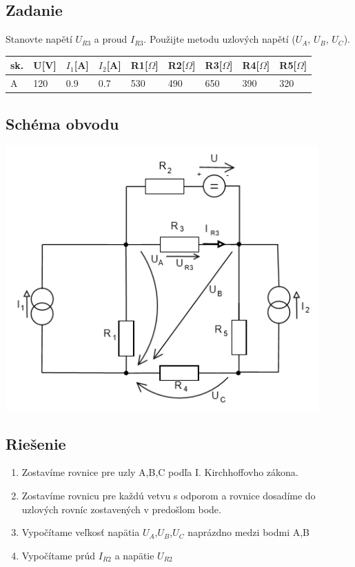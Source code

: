 \documentclass[10pt,a4paper]{article}
\begin{document}
 \subsection*{Zadanie}
 Stanovte napětí $U_{R3}$ a proud $I_{R3}$. Použijte metodu uzlových napětí ($U_{A}$, $U_{B}$,
$U_{C}$).
\begin{center}
    \begin{tabular}{ | l | l | l | l | l | l | l | l | l | }
    \hline
    sk. & U[V] & $I_{1}$[A] & $I_{2}$[A] & R1[$\Omega$] & R2[$\Omega$] & R3[$\Omega$] & R4[$\Omega$] & R5[$\Omega$] \\ \hline
    A & 120 & 0.9 & 0.7 & 530 & 490 & 650 & 390 & 320 \\ \hline
    \end{tabular}
\end{center}



\vspace*{1.5cm}   \subsection*{Schéma obvodu}
\includegraphics[clip, width=12cm]{3.png}


 \vspace*{0.5cm}
 
 \subsection*{Riešenie}
 \begin{enumerate}
\item Zostavíme rovnice pre uzly A,B,C podľa I. Kirchhoffovho zákona.
\item Zostavíme rovnicu pre každú vetvu s odporom a rovnice dosadíme do uzlových rovníc zostavených v predošlom bode.
\item Vypočítame veľkosť napätia $U_{A}$,$U_{B}$,$U_{C}$ naprázdno medzi bodmi A,B
\item Vypočítame prúd $I_{R2}$ a napätie $U_{R2}$
\end{enumerate}
\end{document}
